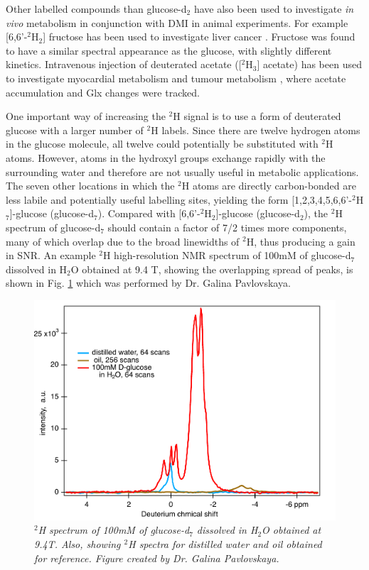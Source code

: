 Other labelled compounds than glucose-d$_2$ have also been used to investigate \textit{in vivo} metabolism in conjunction with \ac{DMI} in animal experiments. For example [6,6'-$^2$H$_2$] fructose has been used to investigate liver cancer \cite{Zhang202366-2H2Cancer}. Fructose was found to have a similar spectral appearance as the glucose, with slightly different kinetics. Intravenous injection of deuterated acetate ([$^2$H$_3$] acetate) has been used to investigate myocardial metabolism \cite{Wang2021NoninvasiveImaging} and tumour metabolism \cite{DeFeyter2018DeuteriumVivo}, where acetate accumulation and Glx changes were tracked.

One important way of increasing the $^2$H signal is to use a form of deuterated glucose with a larger number of $^2$H labels. Since there are twelve hydrogen atoms in the glucose molecule, all twelve could potentially be substituted with $^2$H atoms. However, atoms in the hydroxyl groups exchange rapidly with the surrounding water and therefore are not usually useful in metabolic applications. The seven other locations in which the $^2$H atoms are directly carbon-bonded are less labile and potentially useful labelling sites, yielding the form [1,2,3,4,5,6,6'-$^2$H$_7$]-glucose (glucose-d$_7$). Compared with [6,6'-$^2$H$_2$]-glucose (glucose-d$_2$), the $^2$H spectrum of glucose-d$_7$ should contain a factor of 7/2 times more components, many of which overlap due to the broad linewidths of $^2$H, thus producing a gain in \ac{SNR}. An example $^2$H high-resolution NMR spectrum of 100mM of glucose-d$_7$ dissolved in H$_2$O obtained at 9.4 T, showing the overlapping spread of peaks, is shown in Fig. \ref{fig:glu:NMR} which was performed by Dr. Galina Pavlovskaya.

\begin{figure}
    \centering
    \includegraphics[width=0.9\linewidth]{Figures/Glucose/D7_Spectra.pdf}
    \caption{\textit{$^2$H spectrum of 100mM of glucose-d$_7$ dissolved in H$_2$O obtained at 9.4T. Also, showing $^2$H spectra for distilled water and oil obtained for reference. Figure created by Dr. Galina Pavlovskaya.}}
    \label{fig:glu:NMR}
\end{figure}

